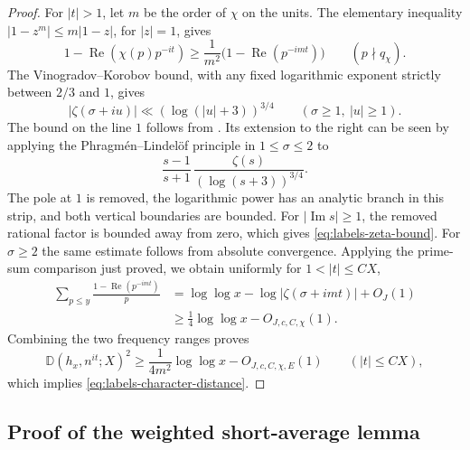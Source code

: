 \begin{proof}
For $|t|>1$, let $m$ be the order of $\chi$ on the units.  The elementary
inequality $|1-z^m|\leq m|1-z|$, for $|z|=1$, gives
\[
 1-\operatorname{Re}(\chi(p)p^{-it})
 \geq\frac1{m^2}\bigl(1-\operatorname{Re}(p^{-imt})\bigr)
 \qquad(p\nmid q_\chi).
\]
The Vinogradov--Korobov bound, with any fixed logarithmic exponent
strictly between $2/3$ and $1$, gives
\begin{equation}\label{eq:labels-zeta-bound}
 |\zeta(\sigma+iu)|\ll
       (\log(|u|+3))^{3/4}
 \qquad(\sigma\geq1,\ |u|\geq1).
\end{equation}
The bound on the line $1$ follows from
\cite[(1.2)]{FordZeta2022}.  Its extension to the right can be seen
by applying the Phragm\'en--Lindel\"of principle in $1\leq\sigma\leq2$
to
\[
 \frac{s-1}{s+1}\,
       \frac{\zeta(s)}{(\log(s+3))^{3/4}}.
\]
The pole at $1$ is removed, the logarithmic power has an analytic
branch in this strip, and both vertical boundaries are bounded.
For $|\operatorname{Im}s|\geq1$, the removed rational factor is
bounded away from zero, which gives \eqref{eq:labels-zeta-bound}.
For $\sigma\geq2$ the same estimate follows from absolute
convergence.
Applying the prime-sum comparison just proved, we obtain uniformly for
$1<|t|\leq CX$,
\begin{align*}
 \sum_{p\leq y}\frac{1-\operatorname{Re}(p^{-imt})}{p}
 &=\log\log x-\log|\zeta(\sigma+imt)|+O_J(1)\\
 &\geq\tfrac14\log\log x-O_{J,c,C,\chi}(1).
\end{align*}
Combining the two frequency ranges proves
\[
 \mathbb D(h_x,n^{it};X)^2
 \geq\frac1{4m^2}\log\log x-O_{J,c,C,\chi,E}(1)
 \qquad(|t|\leq CX),
\]
which implies \eqref{eq:labels-character-distance}.
\end{proof}

\subsection{Proof of the weighted short-average lemma}

